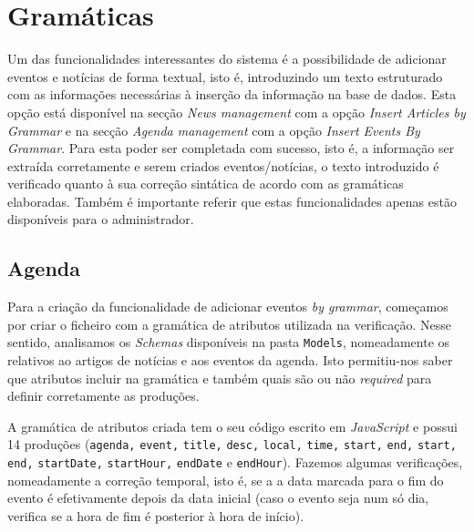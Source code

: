 \section{Gramáticas}\label{c:gramaticas}
Um das funcionalidades interessantes do sistema é a possibilidade de adicionar eventos e notícias de forma textual, isto é, introduzindo um texto estruturado com as informações necessárias à inserção da informação na base de dados. Esta opção está disponível na secção \textit{News management} com a opção \textit{Insert Articles by Grammar} e na secção \textit{Agenda management} com a opção \textit{Insert Events By Grammar}.
Para esta poder ser completada com sucesso, isto é, a informação ser extraída corretamente e serem criados eventos/notícias, o texto introduzido é verificado quanto à sua correção sintática de acordo com as gramáticas elaboradas. Também é importante referir que estas funcionalidades apenas estão disponíveis para o administrador.


\subsection{Agenda}
Para a criação da funcionalidade de adicionar eventos \textit{by grammar}, começamos por criar o ficheiro com a gramática de atributos utilizada na verificação. Nesse sentido, analisamos os \textit{Schemas} disponíveis na pasta \texttt{Models}, nomeadamente os relativos ao artigos de notícias e aos eventos da agenda. Isto permitiu-nos saber que atributos incluir na gramática e também quais são ou não \textit{required} para definir corretamente as produções.

A gramática de atributos criada tem o seu código escrito em \textit{JavaScript} e possui 14 produções (\texttt{agenda,} \texttt{event,} \texttt{title,} \texttt{desc,} \texttt{local,} \texttt{time,} \texttt{start,} \texttt{end,} \texttt{start,} \texttt{end,} \texttt{startDate,} \texttt{startHour,} \texttt{endDate} e \texttt{endHour}).
Fazemos algumas verificações, nomeadamente a correção temporal, isto é, se a a data marcada para o fim do evento é efetivamente depois da data inicial (caso o evento seja num só dia, verifica se a hora de fim é posterior à hora de início).

